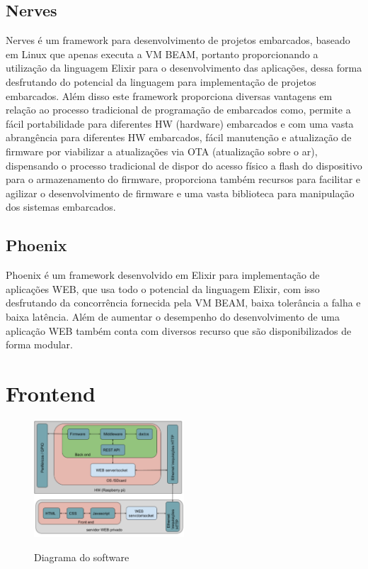 \documentclass[../../layout.tex]{subfiles}
\begin{document}
\subsection{Nerves}
\hspace*{3em}Nerves é um framework para desenvolvimento de projetos embarcados, baseado em Linux que apenas executa a VM BEAM, portanto proporcionando a utilização da linguagem Elixir para o desenvolvimento das aplicações, dessa forma desfrutando do potencial da linguagem para implementação de projetos embarcados. Além disso este framework proporciona diversas vantagens  em relação ao processo tradicional de programação de embarcados como, permite a fácil portabilidade para diferentes HW (hardware) embarcados e com uma vasta abrangência para diferentes HW embarcados, fácil manutenção e atualização de firmware por viabilizar a atualizações via OTA (atualização sobre o ar), dispensando o processo tradicional de dispor do acesso físico a flash do dispositivo para o armazenamento do firmware, proporciona também recursos para facilitar e agilizar o desenvolvimento de firmware e uma vasta biblioteca para manipulação dos sistemas embarcados\cite{nerves}.

\subsection{Phoenix}
\hspace*{3em}Phoenix é um framework desenvolvido em Elixir para implementação de aplicações WEB, que usa todo o potencial da linguagem Elixir, com isso desfrutando da concorrência fornecida pela VM BEAM, baixa tolerância a falha e baixa latência.  Além de aumentar o desempenho do desenvolvimento de  uma aplicação WEB também conta com diversos recurso que são disponibilizados de forma modular\cite{phoenix}.

\section{Frontend}
\hspace*{3em}\blindtext[1]

\begin{figure}[H]
\centering
\caption{Diagrama do software}
\includegraphics[width=0.5\textwidth]{assets/static/img/diagrama_tcc.PNG}
\label{fig:diagrama_sw}
\end{figure}
\end{document}
